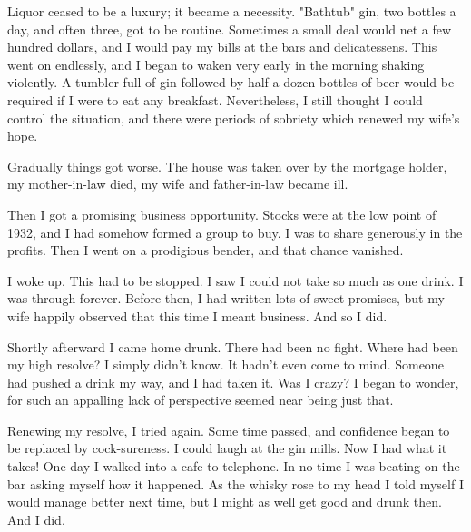 \begin{biblechapter}
    Liquor ceased to be a luxury; 
    it became a necessity.
\verse "Bathtub" gin, two bottles a day, and often three, got to be routine.
\verse Sometimes a small deal would net a few hundred dollars, 
    and I would pay my bills at the bars and delicatessens.
\verse This went on endlessly, 
    and I began to waken very early in the morning shaking violently.
\verse A tumbler full of gin followed by half a dozen bottles of beer 
    would be required if I were to eat any breakfast.
\verse Nevertheless, I still thought I could control the situation, 
    and there were periods of sobriety which renewed my wife's hope.

\verse Gradually things got worse.
\verse The house was taken over by the mortgage holder, 
    my mother-in-law died, 
    my wife and father-in-law became ill.

\verse Then I got a promising business opportunity.
\verse Stocks were at the low point of 1932, 
    and I had somehow formed a group to buy.
\verse I was to share generously in the profits.
\verse Then I went on a prodigious bender, and that chance vanished.

\verse I woke up.
\verse This had to be stopped. 
\verse I saw I could not take so much as one drink.
\verse I was through forever.
\verse Before then, I had written lots of sweet promises, 
    but my wife happily observed that this time I meant business.
\verse And so I did.

\verse Shortly afterward I came home drunk.
\verse There had been no fight.
\verse Where had been my high resolve?
\verse I simply didn't know.
\verse It hadn't even come to mind.
\verse Someone had pushed a drink my way, and I had taken it.
\verse Was I crazy?
\verse I began to wonder, 
    for such an appalling lack of perspective seemed near being just that.

\verse Renewing my resolve, I tried again.
\verse Some time passed, and confidence began to be replaced by cock-sureness.
\verse I could laugh at the gin mills.
\verse Now I had what it takes!
\verse One day I walked into a cafe to telephone.
\verse In no time I was beating on the bar asking myself how it happened.
\verse As the whisky rose to my head I told myself I would manage better next time, 
    but I might as well get good and drunk then.
\verse And I did.
\end{biblechapter}


